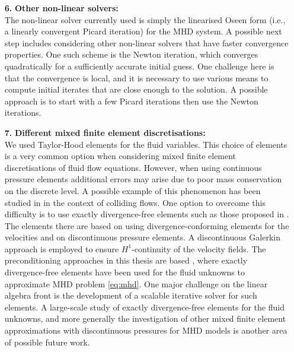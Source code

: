 \begin{itemize}
    \item[\textbf{6.}] \textbf{Other non-linear solvers:} ~\\ The non-linear solver currently used is  simply the linearised Oseen form (i.e., a linearly convergent Picard iteration) for the MHD system. A possible next step includes considering other non-linear solvers that have faster convergence properties. One such scheme is the Newton iteration, which converges quadratically for a sufficiently accurate initial guess. One challenge here is that the convergence is local, and it is necessary to use various means to compute initial iterates that are close enough to the solution. A possible approach is to start with a few Picard iterations then use the Newton iterations.
    \item[\textbf{7.}] \textbf{Different mixed finite element discretisations:} ~\\ We used Taylor-Hood elements \cite{taylor1973numerical} for the fluid variables. This choice of elements is a very common option when considering mixed finite element discretisations of fluid flow equations. However, when using continuous pressure elements additional errors may arise due to poor mass conservation on the discrete level. A possible example of this phenomenon has been studied in \cite{MR2571343} in the context of colliding flows. One option to overcome this difficulty is to use exactly divergence-free elements such as those proposed in \cite{MR2304270,GreifLiSchotzauWei2010}. The elements there are based on using divergence-conforming elements for the velocities and on discontinuous pressure elements. A discontinuous Galerkin approach is employed to ensure  $H^1$-continuity of the velocity fields. The preconditioning approaches in this thesis are based \cite{li2010numerical}, where exactly divergence-free elements have been used for the fluid unknowns to approximate MHD problem \eqref{eq:mhd}. One major challenge  on the linear algebra front is the development of a scalable iterative solver for such elements. A large-scale study of exactly divergence-free elements for the fluid unknowns, and more generally the investigation of other mixed finite element approximations with discontinuous pressures for  MHD models is another area of possible future work.

\end{itemize}



